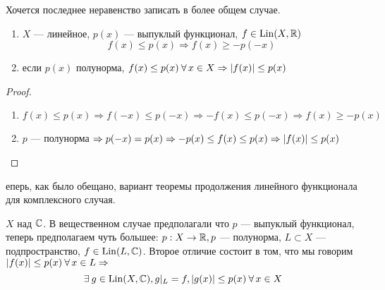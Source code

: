 \documentclass[document]{subfiles}
\begin{document}
Хочется последнее неравенство записать в более общем случае.
\begin{statement}
    \begin{enumerate}       
        \item $X$ --- линейное, $p(x)$ --- выпуклый функционал, $f \in \operatorname{Lin}(X, \mathbb{R})$
        \[ f(x) \leq p(x) \Rightarrow f(x) \geq -p(-x) \] 
        \item если $p(x)$ полунорма, $f(x) \leq p(x) \: \forall x \in X \Rightarrow \abs{f(x)} \leq p(x)$
    \end{enumerate}
\end{statement}

\begin{proof}
    \begin{enumerate}
        \item $f(x) \leq p(x) \Rightarrow f(-x) \leq p(-x) \Rightarrow -f(x) \leq p(-x) \Rightarrow f(x) \geq -p(x) $
        \item $p$ --- полунорма $\Rightarrow p(-x) = p(x) \Rightarrow -p(x) \leq f(x) \leq p(x) \Rightarrow \left| {f(x)} \right| \leq p(x)$
    \end{enumerate}
\end{proof}

еперь, как было обещано, вариант теоремы продолжения линейного функционала для комплексного случая.

\begin{theorem}
    $X$ над $\mathbb{C}$. В вещественном случае предполагали что $p$ --- выпуклый функционал, теперь предполагаем чуть большее: $p: X \rightarrow \mathbb{R}, p$ --- полунорма,
    $L \subset X$ --- подпространство, $f \in \operatorname{Lin}(L, \mathbb{C})$. Второе отличие состоит в том, что мы говорим $\abs{f(x)} \leq p(x) \: \forall x \in L \Rightarrow$ 
    \[ \exists g \in \Lin(X, \bC), g |_L = f, \abs{g(x)} \leq p(x) \: \forall x \in X \]
\end{theorem}
\end{document}
